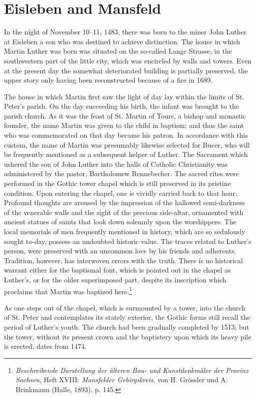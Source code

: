 \section{Eisleben and Mansfeld}

In the night of November 10--11, 1483, there was born to the miner
John Luther at Eisleben a son who was destined to achieve distinction.
The house in which Martin Luther was born was situated on the so-called
Lange Strasse, in the southwestern part of the little city, which
was encircled by walls and towers. Even at the present day the
somewhat deteriorated building is partially preserved, the upper story only
having been reconstructed because of a fire in 1689.

The house in which Martin first saw the light of day lay within the
limits of St. Peter’s parish. On the day succeeding his birth, the infant
was brought to the parish church. As it was the feast of St. Martin of
Tours, a bishop and monastic founder, the name Martin was given
to the child in baptism; and thus the saint who was commemorated on that day became his patron. In accordance with this custom,
the name of Martin was presumably likewise selected for Bucer, who
will be frequently mentioned as a subsequent helper of Luther. The
Sacrament which ushered the son of John Luther into the halls of Catholic Christianity was administered by the pastor, Bartholomew Rennebecher.
The sacred rites were performed in the Gothic tower chapel
which is still preserved in its pristine condition. Upon entering the
chapel, one is vividly carried back to that hour. Profound thoughts are
aroused by the impression of the hallowed semi-darkness of the venerable walls and the sight of the precious side-altar, ornamented with
ancient statues of saints that look down solemnly upon the worshippers.
The local memorials of men frequently mentioned in history, which are
so sedulously sought to-day, possess an undoubted historic value. The
traces related to Luther’s person, were preserved with an uncommon
love by his friends and adherents. Tradition, however, has interwoven
errors with the truth. There is no historical warrant either for the baptismal font, which is pointed out in the chapel as Luther’s, or for the older superimposed part, despite its inscription which proclaims that
Martin was baptized here.\footnote{\textit{Beschreibende Darstellung der älteren Bau- und Kunstdenkmäler der Provinz Sachsen}, Heft XVIII: \textit{Mansfelder Gebirgskreis}, von H. Grössler und A. Brinkmann (Halle, 1893), p. 145.}

As one steps out of the chapel, which is surmounted by a tower, into
the church of St. Peter and contemplates its stately exterior, the Gothic
forms still recall the period of Luther’s youth. The church had been
gradually completed by 1513; but the tower, without its present
crown and the baptistery upon which its heavy pile is erected, dates
from 1474.

